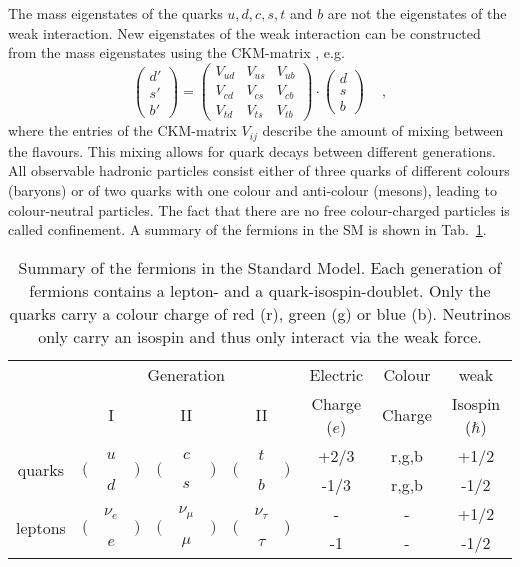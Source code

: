 \noindent The mass eigenstates of the quarks $u,d,c,s,t$ and $b$ are not the eigenstates of the weak interaction. New eigenstates of the weak interaction can be constructed from the mass eigenstates using the CKM-matrix \cite{CKM}, e.g.
\begin{equation}
\begin{pmatrix} d' \\ s' \\ b' \end{pmatrix} 
= \begin{pmatrix}
V_{ud} & V_{us} & V_{ub} \\
V_{cd} & V_{cs} & V_{cb} \\
V_{td} & V_{ts} & V_{tb}
\end{pmatrix}
\cdot \begin{pmatrix} d \\ s \\ b \end{pmatrix} \quad ~,
\end{equation}
where the entries of the CKM-matrix $V_{ij}$ describe the amount of mixing between the flavours. This mixing allows for quark decays between different generations. All observable hadronic particles consist either of three quarks of different colours (baryons) or of two quarks with one colour and anti-colour (mesons), leading to colour-neutral particles. The fact that there are no free colour-charged particles is called confinement. A summary of the fermions in the SM is shown in Tab.~\ref{tab:theo:fermions}.\\
\begin{table}[]
	\centering
	\caption[Summary of the fermions in the Standard Model]{Summary of the fermions in the Standard Model. Each generation of fermions contains a lepton- and a quark-isospin-doublet. Only the quarks carry a colour charge of red (r), green (g) or blue (b). Neutrinos only carry an isospin and thus only interact via the weak force.}
	\label{tab:theo:fermions}
	\begin{tabular}{crclrclrclccc}
	\hline
	& \multicolumn{9}{c}{Generation} & Electric & Colour &  weak \\
	& \multicolumn{3}{c}{I} & \multicolumn{3}{c}{II} & \multicolumn{3}{c}{II} & Charge ($e$) & Charge &  Isospin ($\hbar$) \\
	\hline
	\multirow{2}{*}{quarks} & \multirow{2}{*}{$\Big($} & $u$ & \multirow{2}{*}{$\Big)$} & \multirow{2}{*}{$\Big($} & $c$ & \multirow{2}{*}{$\Big)$} & \multirow{2}{*}{$\Big($} & $t$ & \multirow{2}{*}{$\Big)$} & +2/3 & r,g,b & +1/2 \\  
	 & & $d$ & & & $s$ & & & $b$ & & -1/3 & r,g,b & -1/2 \\ 
	\multirow{2}{*}{leptons}& \multirow{2}{*}{$\Big($} & $\nu_e$ & \multirow{2}{*}{$\Big)$} & \multirow{2}{*}{$\Big($} & $\nu_\mu$ & \multirow{2}{*}{$\Big)$} & \multirow{2}{*}{$\Big($} & $\nu_\tau$ & \multirow{2}{*}{$\Big)$} & - & - & +1/2 \\ 
	 & & $e$ & & & $\mu$ & & & $\tau$ & & -1 & - & -1/2 \\
	\hline
	\end{tabular}
\end{table}


